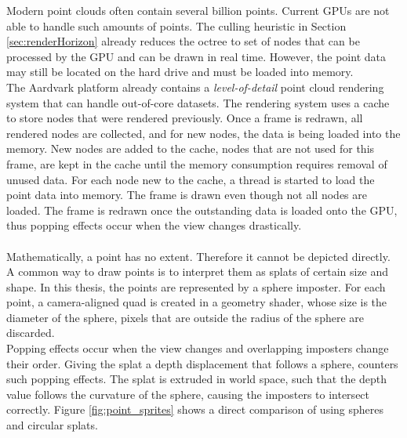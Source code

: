 Modern point clouds often contain several billion points. Current GPUs are not able to handle such amounts of points. The culling heuristic in Section \ref{sec:renderHorizon} already reduces the octree to set of nodes that can be processed by the GPU and can be drawn in real time. However, the point data may still be located on the hard drive and must be loaded into memory. 
\\
The Aardvark platform already contains a \textit{level-of-detail} point cloud rendering system that can handle out-of-core datasets. The rendering system uses a cache to store nodes that were rendered previously. Once a frame is redrawn, all rendered nodes are collected, and for new nodes, the data is being loaded into the memory. New nodes are added to the cache, nodes that are not used for this frame, are kept in the cache until the memory consumption requires removal of unused data. For each node new to the cache, a thread is started to load the point data into memory. The frame is drawn even though not all nodes are loaded. The frame is redrawn once the outstanding data is loaded onto the GPU, thus popping effects occur when the view changes drastically. 
\\
\\
Mathematically, a point has no extent. Therefore it cannot be depicted directly. A common way to draw points is to interpret them as splats of certain size and shape. In this thesis, the points are represented by a sphere imposter. For each point, a camera-aligned quad is created in a geometry shader, whose size is the diameter of the sphere, pixels that are outside the radius of the sphere are discarded. 
\\
Popping effects occur when the view changes and overlapping imposters change their order. Giving the splat a depth displacement that follows a sphere, counters such popping effects. The splat is extruded in world space, such that the depth value follows the curvature of the sphere, causing the imposters to intersect correctly. Figure \ref{fig:point_sprites} shows a direct comparison of using spheres and circular splats. 


